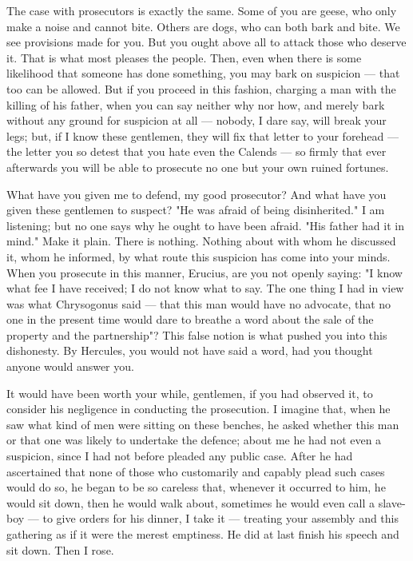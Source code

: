  The case with prosecutors is exactly the same. Some of you are geese, who only make a noise and cannot bite. Others are dogs, who can both bark and bite. We see provisions made for you. But you ought above all to attack those who deserve it. That is what most pleases the people. Then, even when there is some likelihood that someone has done something, you may bark on suspicion --- that too can be allowed. But if you proceed in this fashion, charging a man with the killing of his father, when you can say neither why nor how, and merely bark without any ground for suspicion at all --- nobody, I dare say, will break your legs; but, if I know these gentlemen, they will fix that letter to your forehead --- the letter you so detest that you hate even the Calends --- so firmly that ever afterwards you will be able to prosecute no one but your own ruined fortunes.

 What have you given me to defend, my good prosecutor? And what have you given these gentlemen to suspect? "He was afraid of being disinherited." I am listening; but no one says why he ought to have been afraid. "His father had it in mind." Make it plain. There is nothing. Nothing about with whom he discussed it, whom he informed, by what route this suspicion has come into your minds. When you prosecute in this manner, Erucius, are you not openly saying: "I know what fee I have received; I do not know what to say. The one thing I had in view was what Chrysogonus said --- that this man would have no advocate, that no one in the present time would dare to breathe a word about the sale of the property and the partnership"? This false notion is what pushed you into this dishonesty. By Hercules, you would not have said a word, had you thought anyone would answer you.

 It would have been worth your while, gentlemen, if you had observed it, to consider his negligence in conducting the prosecution. I imagine that, when he saw what kind of men were sitting on these benches, he asked whether this man or that one was likely to undertake the defence; about me he had not even a suspicion, since I had not before pleaded any public case. After he had ascertained that none of those who customarily and capably plead such cases would do so, he began to be so careless that, whenever it occurred to him, he would sit down, then he would walk about, sometimes he would even call a slave-boy --- to give orders for his dinner, I take it --- treating your assembly and this gathering as if it were the merest emptiness. He did at last finish his speech and sit down. Then I rose.

